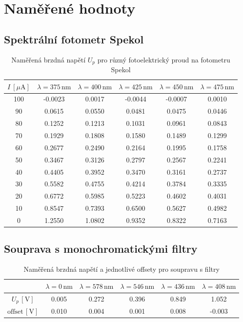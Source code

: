 \documentclass[a4paper,12pt]{article}
\begin{document}
\newpage
\section{Naměřené hodnoty}

\subsection{Spektrální fotometr Spekol}

\begin{table}[H]
\centering
\renewcommand{\arraystretch}{1.5}
\begin{tabular}{|c|c|c|c|c|c|}
\hline
$I\ [\mu\mathrm{A}]$ &
$\lambda=375\,\mathrm{nm}$ &
$\lambda=400\,\mathrm{nm}$ &
$\lambda=425\,\mathrm{nm}$ &
$\lambda=450\,\mathrm{nm}$ &
$\lambda=475\,\mathrm{nm}$ \\
\hline
100 & -0.0023 & 0.0017 & -0.0044 & -0.0007 & 0.0010 \\
90  & 0.0615  & 0.0550 & 0.0481  & 0.0475  & 0.0446 \\
80  & 0.1252  & 0.1213 & 0.1031  & 0.0961  & 0.0843 \\
70  & 0.1929  & 0.1808 & 0.1580  & 0.1489  & 0.1299 \\
60  & 0.2677  & 0.2490 & 0.2164  & 0.1995  & 0.1758 \\
50  & 0.3467  & 0.3126 & 0.2797  & 0.2567  & 0.2241 \\
40  & 0.4405  & 0.3952 & 0.3470  & 0.3161  & 0.2737 \\
30  & 0.5582  & 0.4755 & 0.4214  & 0.3784  & 0.3335 \\
20  & 0.6772  & 0.5985 & 0.5223  & 0.4602  & 0.4031 \\
10  & 0.8547  & 0.7393 & 0.6500  & 0.5627  & 0.4982 \\
0   & 1.2550  & 1.0802 & 0.9352  & 0.8322  & 0.7163 \\
\hline
\end{tabular}
\caption{Naměřená brzdná napětí $U_p$ pro různý fotoelektrický proud na fotometru Spekol}
\end{table}

\subsection{Souprava s monochromatickými filtry}

\begin{table}[H]
\centering
\renewcommand{\arraystretch}{1.5}
\begin{tabular}{|c|c|c|c|c|c|}
\hline
 & $\lambda = 0\,\mathrm{nm}$ & $\lambda = 578\,\mathrm{nm}$ & $\lambda = 546\,\mathrm{nm}$ & $\lambda = 436\,\mathrm{nm}$ & $\lambda = 408\,\mathrm{nm}$ \\
\hline
$U_p\,[\mathrm{V}]$     & 0.005 & 0.272 & 0.396 & 0.849 & 1.052 \\
$\text{offset}\,[\mathrm{V}]$ & 0.010 & 0.004 & 0.001 & 0.008 & -0.003 \\
\hline
\end{tabular}
\caption{Naměřená brzdná napětí a jednotlivé offsety pro soupravu s filtry}
\end{table}
\end{document}
